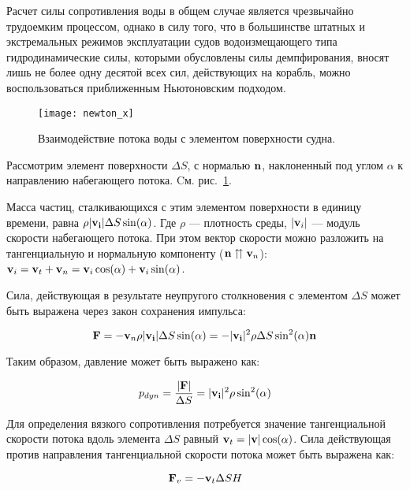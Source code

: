 Расчет силы сопротивления воды в общем случае является чрезвычайно трудоемким процессом, однако в силу того, что в большинстве штатных и экстремальных режимов эксплуатации судов водоизмещающего типа гидродинамические силы, которыми обусловлены силы демпфирования, вносят лишь не более одну десятой всех сил, действующих на корабль, можно воспользоваться приближенным Ньютоновским подходом.

\begin{figure}[ht]
\begin{center}
\texttt{[image: newton\_x]}
\end{center}
\caption{Взаимодействие потока воды с элементом поверхности судна.}
\label{newton_x}
\end{figure}

Рассмотрим элемент поверхности $\Delta S$, с нормалью $\mathbf{n}$, наклоненный под углом $\alpha$ к направлению набегающего потока. Cм. рис.~\ref{newton_x}.

Масса частиц, сталкивающихся с этим элементом поверхности в единицу времени, равна 
$\rho \lvert\mathbf{v_i}\rvert \Delta S \sin(\alpha)$. Где $\rho$ --- плотность среды, $\lvert\mathbf{v}_i\rvert$ --- модуль скорости набегающего потока. При этом вектор скорости можно разложить на тангенциальную и нормальную компоненту ($\mathbf{n} \upuparrows \mathbf{v}_n$): $\mathbf{v}_{i}=\mathbf{v}_t + \mathbf{v}_n = \mathbf{v}_{i} \cos(\alpha) + \mathbf{v}_{i} \sin(\alpha)$.

Сила, действующая в результате неупругого столкновения с элементом $\Delta S$
может быть выражена через закон сохранения импульса:

\begin{equation}
	\mathbf{F} = -\mathbf{v}_n \rho \lvert\mathbf{v_i}\rvert \Delta S \sin(\alpha)
			 = -\lvert\mathbf{v_i}\rvert^2 \rho \Delta S \sin^2(\alpha) \mathbf{n}
\end{equation}

Таким образом, давление может быть выражено как:

\begin{equation}
	p_{dyn} = \frac{\lvert\mathbf{F}\rvert}{\Delta S} = \lvert\mathbf{v_i}\rvert^2 \rho \sin^2(\alpha)
\end{equation}

Для определения вязкого сопротивления потребуется значение тангенциальной скорости потока вдоль элемента 
$\Delta S$ равный $\mathbf{v}_t = \lvert\mathbf{v}\rvert \cos(\alpha)$. Сила действующая против направления тангенциальной скорости потока может быть выражена как:

\begin{equation}
	\mathbf{F}_v = -\mathbf{v}_t \Delta S H
\end{equation}



